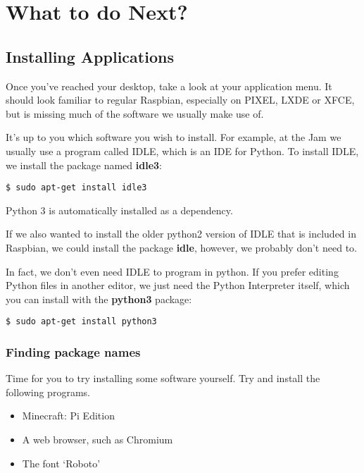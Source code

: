 \section{What to do Next?}

	\subsection*{Installing Applications}

		Once you've reached your desktop, take a look at your application menu. It should look familiar to regular Raspbian, especially on PIXEL, LXDE or XFCE, but is missing much of the software we usually make use of.
		
		It's up to you which software you wish to install. For example, at the Jam we usually use a program called IDLE, which is an IDE for Python. To install IDLE, we install the package named \textbf{idle3}:
\begin{lstlisting}[style=Terminal]
$ sudo apt-get install idle3
\end{lstlisting}

		Python 3 is automatically installed as a dependency.
		
		If we also wanted to install the older python2 version of IDLE that is included in Raspbian, we could install the package \textbf{idle}, however, we probably don't need to.
		
		In fact, we don't even need IDLE to program in python. If you prefer editing Python files in another editor, we just need the Python Interpreter itself, which you can install with the \textbf{python3} package:
\begin{lstlisting}[style=Terminal]
$ sudo apt-get install python3
\end{lstlisting}

		\subsubsection*{Finding package names}
		
			Time for you to try installing some software yourself. Try and install the following programs.
	
	\begin{itemize}[nosep]
		\item Minecraft: Pi Edition
		\item A web browser, such as Chromium
		\item The font `Roboto'
	\end{itemize}
	
